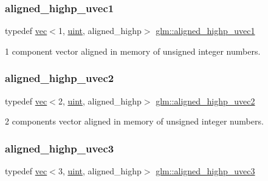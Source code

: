 \subsubsection{\texorpdfstring{aligned\+\_\+highp\+\_\+uvec1}{aligned\_highp\_uvec1}}
{\footnotesize\ttfamily typedef \hyperlink{structglm_1_1vec}{vec}$<$1, \hyperlink{group__core__precision_ga4fd29415871152bfb5abd588334147c8}{uint}, aligned\+\_\+highp$>$ \hyperlink{group__gtc__type__aligned_ga3ba8c6f6b81f57159b0536ce5d4339d0}{glm\+::aligned\+\_\+highp\+\_\+uvec1}}



1 component vector aligned in memory of unsigned integer numbers. 

\mbox{\label{group__gtc__type__aligned_ga4497b2f3be81910c7a1bf632b51ac9a6}} 
\subsubsection{\texorpdfstring{aligned\+\_\+highp\+\_\+uvec2}{aligned\_highp\_uvec2}}
{\footnotesize\ttfamily typedef \hyperlink{structglm_1_1vec}{vec}$<$2, \hyperlink{group__core__precision_ga4fd29415871152bfb5abd588334147c8}{uint}, aligned\+\_\+highp$>$ \hyperlink{group__gtc__type__aligned_ga4497b2f3be81910c7a1bf632b51ac9a6}{glm\+::aligned\+\_\+highp\+\_\+uvec2}}



2 components vector aligned in memory of unsigned integer numbers. 

\mbox{\label{group__gtc__type__aligned_ga1d303644825af6267389d6405f490ddc}} 
\subsubsection{\texorpdfstring{aligned\+\_\+highp\+\_\+uvec3}{aligned\_highp\_uvec3}}
{\footnotesize\ttfamily typedef \hyperlink{structglm_1_1vec}{vec}$<$3, \hyperlink{group__core__precision_ga4fd29415871152bfb5abd588334147c8}{uint}, aligned\+\_\+highp$>$ \hyperlink{group__gtc__type__aligned_ga1d303644825af6267389d6405f490ddc}{glm\+::aligned\+\_\+highp\+\_\+uvec3}}




